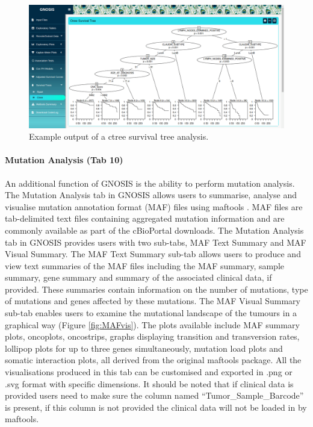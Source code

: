 \begin{figure}
\center
\includegraphics[width=1\textwidth]{../figures/Chapter_3/GNOSIS_Fig9.png}
\caption[Example output of a ctree survival tree analysis.]{Example output of a ctree survival tree analysis.}
\label{fig:GNOSIS_Tab8}
\end{figure}

\paragraph{Mutation Analysis (Tab 10)}
\hfill

\noindent An additional function of GNOSIS is the ability to perform mutation analysis. The Mutation Analysis tab in GNOSIS allows users to summarise, analyse and visualise mutation annotation format (MAF) files using maftools \citep{maftools}. MAF files are tab-delimited text files containing aggregated mutation information and are commonly available as part of the cBioPortal downloads. The Mutation Analysis tab in GNOSIS provides users with two sub-tabs, MAF Text Summary and MAF Visual Summary. The MAF Text Summary sub-tab allows users to produce and view text summaries of the MAF files including the MAF summary, sample summary, gene summary and summary of the associated clinical data, if provided. These summaries contain information on the number of mutations, type of mutations and genes affected by these mutations. The MAF Visual Summary sub-tab enables users to examine the mutational landscape of the tumours in a graphical way (Figure \ref{fig:MAFvis}). The plots available include MAF summary plots, oncoplots, oncostrips, graphs displaying transition and transversion rates, lollipop plots for up to three genes simultaneously, mutation load plots and somatic interaction plots, all derived from the original maftools package. All the visualisations produced in this tab can be customised and exported in .png or .svg format with specific dimensions. It should be noted that if clinical data is provided users need to make sure the column named “Tumor\_Sample\_Barcode” is present, if this column is not provided the clinical data will not be loaded in by maftools.  

